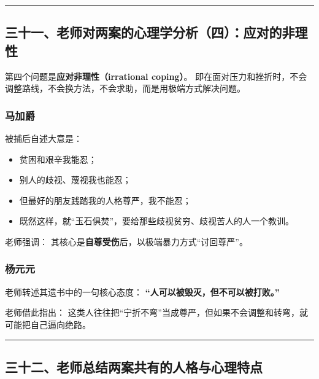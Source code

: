 \documentclass[
  chinese,
  9pt,
  a4paper,
]{ctexart}
\providecommand{\tightlist}{%
  \setlength{\itemsep}{0pt}\setlength{\parskip}{0pt}}
\begin{document}
\begin{center}\rule{0.5\linewidth}{0.5pt}\end{center}

\subsection{三十一、老师对两案的心理学分析（四）：应对的非理性}\label{ux4e09ux5341ux4e00ux8001ux5e08ux5bf9ux4e24ux6848ux7684ux5fc3ux7406ux5b66ux5206ux6790ux56dbux5e94ux5bf9ux7684ux975eux7406ux6027}

第四个问题是\textbf{应对非理性（irrational coping）}。
即在面对压力和挫折时，不会调整路线，不会换方法，不会求助，而是用极端方式解决问题。

\subsubsection{马加爵}\label{ux9a6cux52a0ux7235-1}

被捕后自述大意是：

\begin{itemize}
\tightlist
\item
  贫困和艰辛我能忍；
\item
  别人的歧视、蔑视我也能忍；
\item
  但最好的朋友践踏我的人格尊严，我不能忍；
\item
  既然这样，就``玉石俱焚''，要给那些歧视贫穷、歧视苦人的人一个教训。
\end{itemize}

老师强调： 其核心是\textbf{自尊受伤}后，以极端暴力方式``讨回尊严''。

\subsubsection{杨元元}\label{ux6768ux5143ux5143-1}

老师转述其遗书中的一句核心态度：
\textbf{``人可以被毁灭，但不可以被打败。''}

老师借此指出：
这类人往往把``宁折不弯''当成尊严，但如果不会调整和转弯，就可能把自己逼向绝路。

\begin{center}\rule{0.5\linewidth}{0.5pt}\end{center}

\subsection{三十二、老师总结两案共有的人格与心理特点}\label{ux4e09ux5341ux4e8cux8001ux5e08ux603bux7ed3ux4e24ux6848ux5171ux6709ux7684ux4ebaux683cux4e0eux5fc3ux7406ux7279ux70b9}
\end{document}
